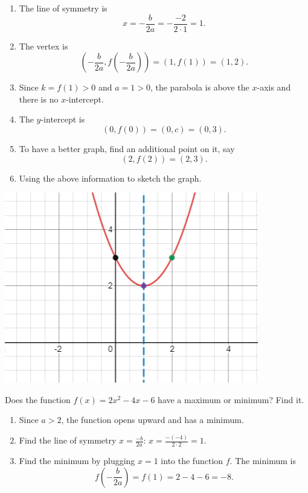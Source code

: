 \documentclass[
  en,11pt]{elegantbook}
\providecommand{\tightlist}{%
  \setlength{\itemsep}{0pt}\setlength{\parskip}{0pt}}
\renewenvironment{example}[1][]{
  \refstepcounter{exam}
  \par\noindent\textbf{\color{main}{\examplename} \theexam #1}
  \rmfamily
}{
  \par\ignorespacesafterend
}
\begin{document}
\begin{solution}
\leavevmode

\begin{enumerate}
\def\labelenumi{\arabic{enumi}.}
\item
  The line of symmetry is
  \[x=-\frac{b}{2a}=-\frac{-2}{2\cdot 1}=1.\]
\item
  The vertex is
  \[(-\frac{b}{2a}, f(-\frac{b}{2a}))=(1, f(1))=(1, 2).\]
\item
  Since \(k=f(1)>0\) and \(a=1>0\), the parabola is above the \(x\)-axis and there is no \(x\)-intercept.
\item
  The \(y\)-intercept is
  \[(0, f(0))=(0, c)=(0, 3).\]
\item
  To have a better graph, find an additional point on it, say
  \[(2, f(2))=(2, 3).\]
\item
  Using the above information to sketch the graph.
\end{enumerate}

\includegraphics{figs/aParabola.png}

\end{solution}

\begin{example}
Does the function \(f(x)=2x^2-4x-6\) have a maximum or minimum? Find it.
\end{example}

\begin{solution}



\begin{enumerate}
\def\labelenumi{\arabic{enumi}.}
\tightlist
\item
  Since \(a>2\), the function opens upward and has a minimum.
\item
  Find the line of symmetry \(x=\frac{-b}{2a}\):
  \(x=\frac{-(-4)}{2\cdot 2}=1\).
\item
  Find the minimum by plugging \(x=1\) into the function \(f\).
  The minimum is
  \[
   f(-\frac{b}{2a})=f(1)=2-4-6=-8.
   \]
\end{enumerate}

\end{solution}
\end{document}
